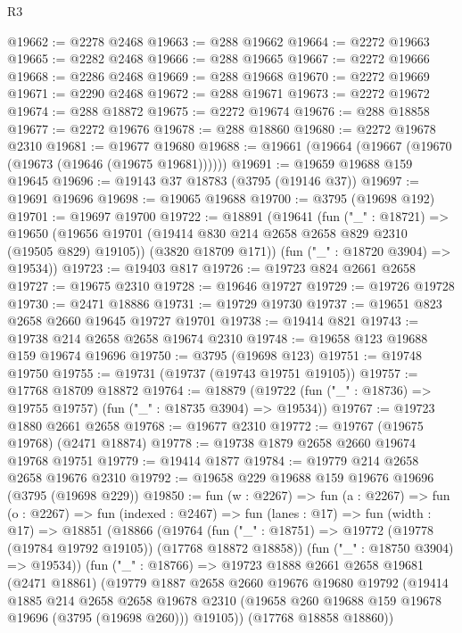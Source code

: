 \begin{lexlean}{R3}
\begin{coremodule}
@19662 := @2278 @2468
@19663 := @288 @19662
@19664 := @2272 @19663
@19665 := @2282 @2468
@19666 := @288 @19665
@19667 := @2272 @19666
@19668 := @2286 @2468
@19669 := @288 @19668
@19670 := @2272 @19669
@19671 := @2290 @2468
@19672 := @288 @19671
@19673 := @2272 @19672
@19674 := @288 @18872
@19675 := @2272 @19674
@19676 := @288 @18858
@19677 := @2272 @19676
@19678 := @288 @18860
@19680 := @2272 @19678 @2310
@19681 := @19677 @19680
@19688 := @19661 (@19664 (@19667 (@19670 (@19673 (@19646 (@19675 @19681))))))
@19691 := @19659 @19688 @159 @19645
@19696 := @19143 @37 @18783 (@3795 (@19146 @37))
@19697 := @19691 @19696
@19698 := @19065 @19688
@19700 := @3795 (@19698 @192)
@19701 := @19697 @19700
@19722 := @18891
    (@19641
      (fun ("_" : @18721) =>
      @19650
        (@19656 @19701 (@19414 @830 @214 @2658 @2658 @829 @2310 (@19505 @829) @19105))
        (@3820 @18709 @171))
      (fun ("_" : @18720 @3904) => @19534))
@19723 := @19403 @817
@19726 := @19723 @824 @2661 @2658
@19727 := @19675 @2310
@19728 := @19646 @19727
@19729 := @19726 @19728
@19730 := @2471 @18886
@19731 := @19729 @19730
@19737 := @19651 @823 @2658 @2660 @19645 @19727 @19701
@19738 := @19414 @821
@19743 := @19738 @214 @2658 @2658 @19674 @2310
@19748 := @19658 @123 @19688 @159 @19674 @19696
@19750 := @3795 (@19698 @123)
@19751 := @19748 @19750
@19755 := @19731 (@19737 (@19743 @19751 @19105))
@19757 := @17768 @18709 @18872
@19764 := @18879 (@19722 (fun ("_" : @18736) => @19755 @19757) (fun ("_" : @18735 @3904) => @19534))
@19767 := @19723 @1880 @2661 @2658
@19768 := @19677 @2310
@19772 := @19767 (@19675 @19768) (@2471 @18874)
@19778 := @19738 @1879 @2658 @2660 @19674 @19768 @19751
@19779 := @19414 @1877
@19784 := @19779 @214 @2658 @2658 @19676 @2310
@19792 := @19658 @229 @19688 @159 @19676 @19696 (@3795 (@19698 @229))
@19850 := fun (w : @2267) =>
  fun (a : @2267) =>
  fun (o : @2267) =>
  fun (indexed : @2467) =>
  fun (lanes : @17) =>
  fun (width : @17) =>
  @18851
    (@18866
      (@19764
        (fun ("_" : @18751) => @19772 (@19778 (@19784 @19792 @19105)) (@17768 @18872 @18858))
        (fun ("_" : @18750 @3904) => @19534))
      (fun ("_" : @18766) =>
      @19723
        @1888
        @2661
        @2658
        @19681
        (@2471 @18861)
        (@19779
          @1887
          @2658
          @2660
          @19676
          @19680
          @19792
          (@19414
            @1885
            @214
            @2658
            @2658
            @19678
            @2310
            (@19658 @260 @19688 @159 @19678 @19696 (@3795 (@19698 @260)))
            @19105))
        (@17768 @18858 @18860))

\end{coremodule}
\end{lexlean}
